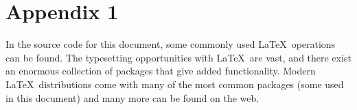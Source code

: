 \chapter*{Appendix 1}\label{app1}

In the source code for this document, some commonly used
\LaTeX\ operations can be found.  The
typesetting opportunities with \LaTeX\ are vast, and there exist an
enormous collection of packages that give added functionality.  Modern
\LaTeX\ distributions come with many of the most common packages (some
used in this document) and many more can be found on the web.

